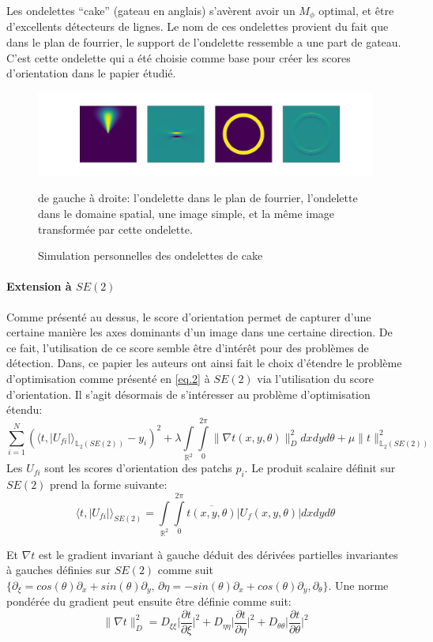 \documentclass{article}
\begin{document}
Les ondelettes ``cake'' (gateau en anglais) s'avèrent avoir un $ M_{\phi} $ optimal, et
être d'excellents détecteurs de lignes. Le nom de ces ondelettes provient du fait que
dans le plan de fourrier, le support de l'ondelette ressemble a une part de gateau.
C'est cette ondelette qui a été choisie comme base pour créer les scores d'orientation
dans le papier étudié.
\vspace{5em}
\begin{figure}[htpb]
\centering
\hspace*{-6em}
\includegraphics[scale=0.39]{plots/cake_wavelet.png}
\caption {Simulation personnelles des ondelettes de  cake}
de gauche à droite: l'ondelette dans le plan de fourrier, l'ondelette dans le domaine
spatial, une image simple, et la même image transformée par cette ondelette.
\end{figure}

\paragraph{Extension à $SE(2)$}
Comme présenté au dessus, le score d'orientation permet de capturer d'une certaine manière les axes dominants d'un image dans une certaine direction. De ce fait, 
l'utilisation de ce score semble être d'intérêt pour des problèmes de détection.
Dans, ce papier les auteurs ont ainsi fait le choix d'étendre le problème d'optimisation comme présenté en \ref{eq.2} à $SE(2)$ via 
l'utilisation du score d'orientation. Il s'agit désormais de s'intéresser au problème d'optimisation étendu:
\[
  \sum \limits_{i=1}^N (\langle t, |U_{fi}| \rangle_{{\mathbb{L}_2(SE(2))}} - y_i)^2 + \lambda \int \limits_{\mathbb{R}^2} \int \limits_{0}^{2\pi} \lVert 
  \nabla t(x, y, \theta)\rVert_{D}^2 dxdyd\theta + \mu \lVert t \rVert_{\mathbb{L}_2(SE(2))}^2
\]
Les $U_{fi}$ sont les scores d'orientation des patchs $p_i$.
Le produit scalaire définit sur $SE(2)$ prend la forme suivante:
\[
    \langle t, |U_{fi}| \rangle_{SE(2)} = 
    \int \limits_{\mathbb{R}^2} \int \limits_{0}^{2\pi} \overline{t(x, y, \theta)} \lvert U_f (x, y, \theta) \rvert dxdyd\theta
\]

Et $\nabla t$ est le gradient invariant à gauche déduit des dérivées partielles invariantes à gauches définies sur $SE(2)$
comme suit $\{\partial_{\xi} = cos(\theta)\partial_x + sin(\theta) \partial_y,\, \partial{\eta} = -sin(\theta) \partial_x + cos(\theta)
\partial_y, \partial_{\theta}\}$. Une norme pondérée du gradient peut ensuite être définie comme suit:
\[
    \lVert \nabla t \rVert_{D}^2 = D_{\xi \xi} \Big|\frac{\partial t}{\partial \xi} \Big|^2
    + D_{\eta \eta} \Big|\frac{\partial t}{\partial \eta}\Big|^2 + D_{\theta \theta} \Big|\frac{\partial t}{\partial \theta}\Big|^2
\]
\end{document}
